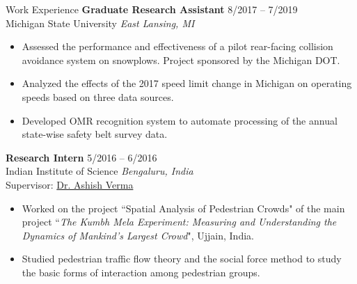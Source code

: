\documentclass{CV} %
\begin{document}
\begin{rSection}{Work Experience}
    {\bf Graduate Research Assistant} \hfill {8/2017 – 7/2019}
    \\ Michigan State University \hfill {\em East Lansing, MI}
    \begin{itemize}[noitemsep]
        \item Assessed the performance and effectiveness of a pilot rear-facing collision avoidance system on snowplows. Project sponsored by the Michigan DOT.
        \item Analyzed the effects of the 2017 speed limit change in Michigan on operating speeds based on three data sources.
        \item Developed OMR recognition system to automate processing of the annual state-wise safety belt survey data.
    \end{itemize}
    
    {\bf Research Intern} \hfill {5/2016 – 6/2016}
    \\ Indian Institute of Science \hfill {\em Bengaluru, India}
    \\ Supervisor: \href{http://civil.iisc.ernet.in/~ashishv/}{Dr. Ashish Verma}
    \begin{itemize}[noitemsep]
        \item Worked on the project ``Spatial Analysis of Pedestrian Crowds" of the main project ``\textit{The Kumbh Mela Experiment: Measuring and Understanding the Dynamics of Mankind’s Largest Crowd}", Ujjain, India.
        \item Studied pedestrian traffic flow theory and the social force method to study the basic forms of interaction among pedestrian groups.
    \end{itemize}
\end{rSection}
\end{document}

